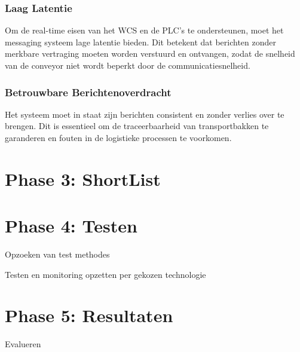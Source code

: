 \subsubsection{Laag Latentie}
Om de real-time eisen van het WCS en de PLC’s te ondersteunen, moet het messaging systeem lage latentie bieden. 
Dit betekent dat berichten zonder merkbare vertraging moeten worden verstuurd en ontvangen, 
zodat de snelheid van de conveyor niet wordt beperkt door de communicatiesnelheid.

\subsubsection{Betrouwbare Berichtenoverdracht}
Het systeem moet in staat zijn berichten consistent en zonder verlies over te brengen. 
Dit is essentieel om de traceerbaarheid van transportbakken te garanderen en fouten in de logistieke processen te voorkomen.
 
\section{Phase 3: ShortList}

\section{Phase 4: Testen}
Opzoeken van test methodes 

Testen en monitoring opzetten per gekozen technologie

\section{Phase 5: Resultaten}

Evalueren
